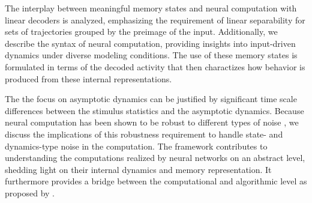 \documentclass[12pt,letterpaper, onecolumn]{article}
\theoremstyle{definition}
\theoremstyle{remark}
\begin{document}
 The interplay between meaningful memory states and neural computation with linear decoders is analyzed, emphasizing the requirement of linear separability for sets of trajectories grouped by the preimage of the input. 
Additionally, we describe the syntax of neural computation, providing insights into input-driven dynamics under diverse modeling conditions.
The use of these memory states is formulated in terms of the decoded activity that then charactizes how behavior is produced from these internal representations. 


The the focus on asymptotic dynamics can be justified by significant time scale differences between the stimulus statistics and the asymptotic dynamics.
Because neural computation has been shown to be robust to different types of noise \cite{Park2023a}, we discuss the implications of this robustness requirement to handle state- and dynamics-type noise in the computation. 
The framework contributes to understanding the computations realized by neural networks on an abstract level, shedding light on their internal dynamics and memory representation.
It furthermore provides a bridge between the computational and algorithmic level as proposed by \cite{marr2010}.







\printbibliography
\end{document}
